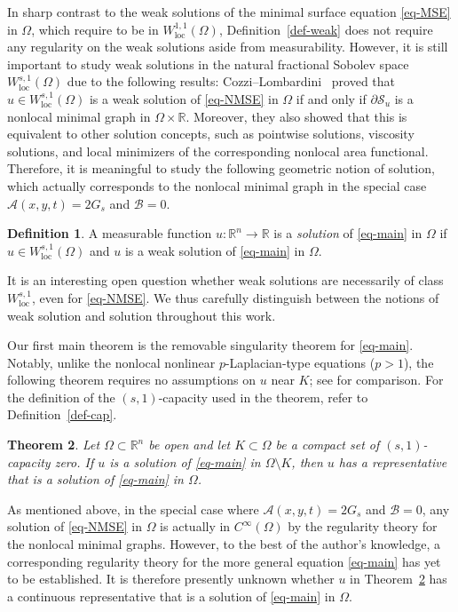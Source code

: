 \documentclass{amsart}
\theoremstyle{plain}
\newtheorem{theorem}{Theorem}[section]
\theoremstyle{definition}
\newtheorem{definition}[theorem]{Definition}
\numberwithin{equation}{section}
\begin{document}
In sharp contrast to the weak solutions of the minimal surface equation \eqref{eq-MSE} in $\Omega$, which require to be in $W^{1, 1}_{\mathrm{loc}}(\Omega)$, Definition~\ref{def-weak} does not require any regularity on the weak solutions aside from measurability. However, it is still important to study weak solutions in the natural fractional Sobolev space $W^{s, 1}_{\mathrm{loc}}(\Omega)$ due to the following results: Cozzi--Lombardini~\cite[Theorem~1.10]{CL21} proved that $u \in W^{s, 1}_{\mathrm{loc}}(\Omega)$ is a weak solution of \eqref{eq-NMSE} in $\Omega$ if and only if $\partial\mathcal{S}_u$ is a nonlocal minimal graph in $\Omega \times \mathbb{R}$. Moreover, they also showed that this is equivalent to other solution concepts, such as pointwise solutions, viscosity solutions, and local minimizers of the corresponding nonlocal area functional. Therefore, it is meaningful to study the following geometric notion of solution, which actually corresponds to the nonlocal minimal graph in the special case $\mathscr{A}(x, y, t)=2G_s$ and $\mathscr{B}=0$.

\begin{definition}
A measurable function $u:\mathbb{R}^n \to \mathbb{R}$ is a \emph{solution} of \eqref{eq-main} in $\Omega$ if $u \in W^{s, 1}_{\mathrm{loc}}(\Omega)$ and $u$ is a weak solution of \eqref{eq-main} in $\Omega$.
\end{definition}

It is an interesting open question whether weak solutions are necessarily of class $W^{s, 1}_{\mathrm{loc}}$, even for \eqref{eq-NMSE}. We thus carefully distinguish between the notions of weak solution and solution throughout this work.

Our first main theorem is the removable singularity theorem for \eqref{eq-main}. Notably, unlike the nonlocal nonlinear $p$-Laplacian-type equations ($p >1$), the following theorem requires no assumptions on $u$ near $K$; see \cite[Theorem~1.1]{KL24} for comparison. For the definition of the $(s, 1)$-capacity used in the theorem, refer to Definition~\ref{def-cap}.

\begin{theorem}\label{thm-main}
Let $\Omega \subset \mathbb{R}^n$ be open and let $K \subset \Omega$ be a compact set of $(s, 1)$-capacity zero. If $u$ is a solution of \eqref{eq-main} in $\Omega \setminus K$, then $u$ has a representative that is a solution of \eqref{eq-main} in $\Omega$.
\end{theorem}

As mentioned above, in the special case where $\mathscr{A}(x, y, t)=2G_s$ and $\mathscr{B}=0$, any solution of \eqref{eq-NMSE} in $\Omega$ is actually in $C^\infty(\Omega)$ by the regularity theory for the nonlocal minimal graphs. However, to the best of the author's knowledge, a corresponding regularity theory for the more general equation \eqref{eq-main} has yet to be established. It is therefore presently unknown whether $u$ in Theorem~\ref{thm-main} has a continuous representative that is a solution of \eqref{eq-main} in $\Omega$.
\end{document}
